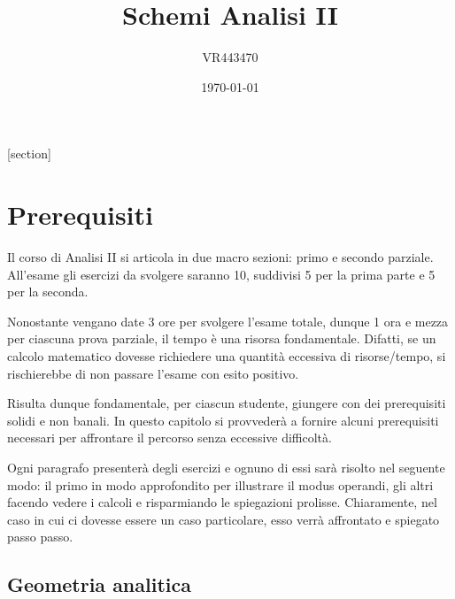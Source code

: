 \documentclass[a4paper]{article}
\begin{document}
	[section]

	\author{VR443470}
	\title{Schemi Analisi II}
	\date{\printdayoff\today}
	\maketitle

	\newpage
	
	\tableofcontents
	
	\newpage
	
	\section{Prerequisiti}\label{section: prerequisiti}
	
	Il corso di Analisi II si articola in due macro sezioni: primo e secondo parziale. All'esame gli esercizi da svolgere saranno 10, suddivisi 5 per la prima parte e 5 per la seconda.\newline
	
	\noindent
	Nonostante vengano date 3 ore per svolgere l'esame totale, dunque 1 ora e mezza per ciascuna prova parziale, il tempo è una risorsa fondamentale. Difatti, se un calcolo matematico dovesse richiedere una quantità eccessiva di risorse/tempo, si rischierebbe di non passare l'esame con esito positivo.\newline
	
	\noindent
	Risulta dunque fondamentale, per ciascun studente, giungere con dei prerequisiti solidi e non banali. In questo capitolo si provvederà a fornire alcuni prerequisiti necessari per affrontare il percorso senza eccessive difficoltà.\newline
	
	\noindent
	Ogni paragrafo presenterà degli esercizi e ognuno di essi sarà risolto nel seguente modo: il primo in modo approfondito per illustrare il modus operandi, gli altri facendo vedere i calcoli e risparmiando le spiegazioni prolisse. Chiaramente, nel caso in cui ci dovesse essere un caso particolare, esso verrà affrontato e spiegato passo passo.\newpage
	
	\subsection{Geometria analitica}\label{subsection: geometria analitica}
	
\end{document}
